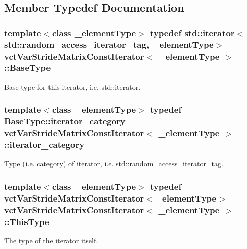 \subsection{Member Typedef Documentation}
\hypertarget{classvct_var_stride_matrix_const_iterator_af92f59f70debf8b2ac92e032621a9b1e}{
\subsubsection[{Base\-Type}]{\setlength{\rightskip}{0pt plus 5cm}template$<$class \-\_\-element\-Type$>$ typedef std\-::iterator$<$std\-::random\-\_\-access\-\_\-iterator\-\_\-tag, \-\_\-element\-Type$>$ {\bf vct\-Var\-Stride\-Matrix\-Const\-Iterator}$<$ \-\_\-element\-Type $>$\-::{\bf Base\-Type}}}\label{classvct_var_stride_matrix_const_iterator_af92f59f70debf8b2ac92e032621a9b1e}
Base type for this iterator, i.\-e. std\-::iterator. \hypertarget{classvct_var_stride_matrix_const_iterator_a1620d069cfd9a2016c871fa2b5fde20a}{
\subsubsection[{iterator\-\_\-category}]{\setlength{\rightskip}{0pt plus 5cm}template$<$class \-\_\-element\-Type$>$ typedef Base\-Type\-::iterator\-\_\-category {\bf vct\-Var\-Stride\-Matrix\-Const\-Iterator}$<$ \-\_\-element\-Type $>$\-::{\bf iterator\-\_\-category}}}\label{classvct_var_stride_matrix_const_iterator_a1620d069cfd9a2016c871fa2b5fde20a}
Type (i.\-e. category) of iterator, i.\-e. std\-::random\-\_\-access\-\_\-iterator\-\_\-tag. \hypertarget{classvct_var_stride_matrix_const_iterator_af68182ea2024c532e999fd1333cb0c6e}{
\subsubsection[{This\-Type}]{\setlength{\rightskip}{0pt plus 5cm}template$<$class \-\_\-element\-Type$>$ typedef {\bf vct\-Var\-Stride\-Matrix\-Const\-Iterator}$<$\-\_\-element\-Type$>$ {\bf vct\-Var\-Stride\-Matrix\-Const\-Iterator}$<$ \-\_\-element\-Type $>$\-::{\bf This\-Type}}}\label{classvct_var_stride_matrix_const_iterator_af68182ea2024c532e999fd1333cb0c6e}
The type of the iterator itself. 

